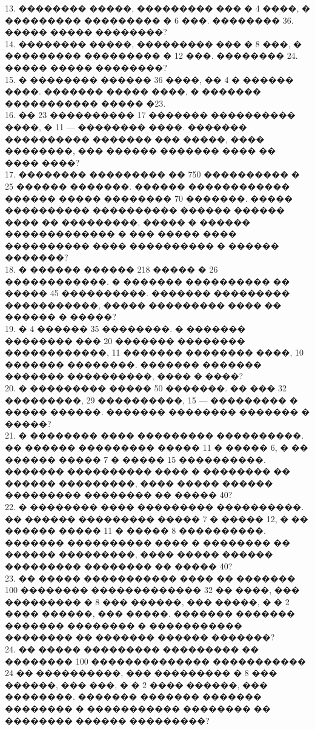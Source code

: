 \documentclass[12pt]{article}
\begin{document}
13. �������� �����, ��������� ��� � 4 ����, � ��������� ��������� � 6 ���. �������� 36. ����� ����� ��������?\\
14. �������� �����, ��������� ��� � 8 ���, � ��������� ��������� � 12 ���. �������� 24. ����� ����� ��������?\\
15. � �������� ������ 36 ����, �� 4 � ������ ����. ������� ����� ����, � ������� ����������� ����� �23.\\
16. �� 23 ���������� 17 ������� ���������� ����, � 11 --- �������� ����. ������� ���������� ������� ��� �����, ���� ��������, ��� ������ ������� ���� �� ���� ����?\\
17. �������� ��������� �� 750 ���������� � 25 ������ �������. ������ ������������ ������ ����� �������� 70 �������. ����� ���������� ���������� ������ ������ ���� �� ���������, ����� � ������ ������������� � ��� ����� ���� ���������� ���� ���������� � ������ �������?\\
18. � ������ ������ 218 ����� � 26 ������������. � ������� ���������� �� ����� 45 ����������. ������� ��������� �����������, ����� ��������� ���� �� ������ � �����?\\
19. � 4 ������ 35 ��������. � ������� �������� ��� 20 ������� �������� ������������, 11 ������� �������� ����, 10 ������� ��������. ������� ������� ������� ����������, ���� � ����?\\
20. � ��������� ����� 50 �������. �� ��� 32 ���������, 29 ����������, 15 --- ��������� � ����� ������. ������� �������� ������� � �����?\\
21. � �������� ���� ��������� ����������. �� ������ ��������� ����� 11 � ����� 6, � �� ������ ����� 7 � ����� 15 ����������. ������� ���������� ���� � �������� �� ������ ���������, ���� ����� ������ ��������� �������� �� ����� 40?\\
22. � �������� ���� ��������� ����������. �� ������ ��������� ����� 7 � ����� 12, � �� ������ ����� 11 � ����� 8 ����������. ������� ���������� ���� � �������� �� ������ ���������, ���� ����� ������ ��������� �������� �� ����� 40?\\
23. �� ����� ����������� ���� �� ������� 100 �������� ������������� 32 �� ����, ��� ��������� � 8 ��� ������, ��� �����, � � 2 ���� ������, ��� �����. ������� ������� ������� �������� � ����������� �������� �� ������� ������ �������?\\
24. �� ����� ��������� ��������� �� �������� 100 �������������� ����������� 24 �� ����������, ��� ��������� � 8 ��� ������, ��� ���, � � 2 ���� ������, ��� ��������. ������� ������� ������� �������� � ����������� �������� �� �������� ������ ���������?\\
\end{document}

